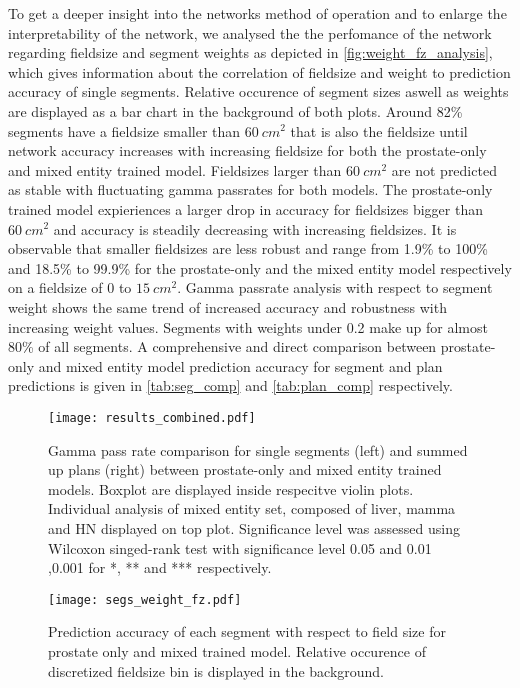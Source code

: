 To get a deeper insight into the networks method of operation and to enlarge the interpretability of the network, we analysed the the perfomance of the network regarding fieldsize and segment weights as depicted in \autoref{fig:weight_fz_analysis}, which gives information about the correlation of fieldsize and weight to prediction accuracy of single segments. 
Relative occurence of segment sizes aswell as weights are displayed as a bar chart in the background of both plots.
Around 82\% segments have a fieldsize smaller than $60~cm^2$ that is also the fieldsize until network accuracy increases with increasing fieldsize for both the prostate-only and mixed entity trained model.
Fieldsizes larger than $60~cm^2$ are not predicted as stable with fluctuating gamma passrates for both models.
The prostate-only trained model expieriences a larger drop in accuracy for fieldsizes bigger than $60~cm^2$ and accuracy is steadily decreasing with increasing fieldsizes. 
It is observable that smaller fieldsizes are less robust and range from 1.9\% to 100\% and 18.5\% to 99.9\% for the prostate-only and the mixed entity model respectively on a fieldsize of 0 to $15~cm^2$.
Gamma passrate analysis with respect to segment weight shows the same trend of increased accuracy and robustness with increasing weight values.
Segments with weights under 0.2 make up for almost 80\% of all segments. 
A comprehensive and direct comparison between prostate-only and mixed entity model prediction accuracy for segment and plan predictions is given in \autoref{tab:seg_comp} and \autoref{tab:plan_comp} respectively.

\begin{figure}
    \centering
    \texttt{[image: results\_combined.pdf]}
    \caption{
        Gamma pass rate comparison for single segments (left) and summed up plans (right) between prostate-only and mixed entity trained models. 
        Boxplot are displayed inside respecitve violin plots. 
        Individual analysis of mixed entity set, composed of liver, mamma and \acs{HN} displayed on top plot. 
        Significance level was assessed using Wilcoxon singed-rank test with significance level 0.05 and 0.01 ,0.001 for *, ** and *** respectively. 
    }\label{fig:comparison}
\end{figure}

\begin{figure}
    \centering
    \texttt{[image: segs\_weight\_fz.pdf]}
    \caption{
        Prediction accuracy of each segment with respect to field size for prostate only and mixed trained model. 
        Relative occurence of discretized fieldsize bin is displayed in the background.}\label{fig:weight_fz_analysis}
\end{figure}

